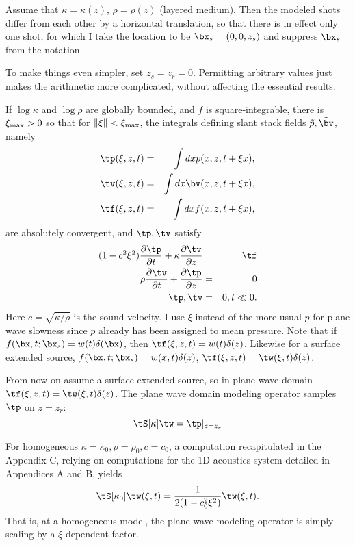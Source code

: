 Assume that $\kappa = \kappa(z)$,
$\rho=\rho(z)$ (layered medium). Then the modeled shots differ from
each other by a horizontal translation, so that there is in effect
only one shot, for which I take the location to be
$\bx_s=(0,0,z_s)$ and suppress $\bx_s$ from the notation.

To make things even simpler, set $z_s=z_r=0$. Permitting arbitrary
values just makes the arithmetic more complicated, without affecting
the essential results.

 If $\log \kappa$ and $\log \rho$ are globally
bounded, and $f$ is square-integrable, there is $\xi_{\rm max} > 0$ so that for $\|\xi\|<\xi_{\rm
  max}$, the integrals defining slant stack fields
$\tilde{p},\tilde{\bv}$, namely
\begin{eqnarray}
\label{eqn:slant}
\tp(\xi,z,t)& = &\int dx p(x,z,t+\xi x),\nonumber\\
\tv(\xi,z,t)&=&\int dx \bv(x,z,t+\xi x),\nonumber\\
\tf(\xi,z,t)&=&\int dx f(x,z,t+\xi x),
\end{eqnarray}
are absolutely convergent, and $\tp, \tv$ satisfy 
\begin{eqnarray}
\label{eqn:awepw}
(1-c^2\xi^2)\frac{\partial \tp}{\partial t} + \kappa\frac{\partial
  \tv}{\partial z} &=& \tf \nonumber\\
\rho \frac{\partial \tv}{\partial t} + \frac{\partial \tp}{\partial
  z}&=&0\nonumber\\
\tp,\tv&=&0, t \ll 0.
\end{eqnarray}
Here $c=\sqrt{\kappa/\rho}$ is the sound velocity. I use $\xi$ instead
of the more usual $p$ for plane wave slowness since $p$ already has
been assigned to mean pressure. Note that if
$f(\bx,t;\bx_s)=w(t)\delta(\bx)$, then
$\tf(\xi,z,t)=w(t)\delta(z)$. Likewise for a surface extended source,
$f(\bx,t;\bx_s) = w(x,t)\delta(z)$, $\tf(\xi,z,t) = \tw(\xi,t)\delta(z)$.

From now on assume a surface extended source, so in plane wave domain
$\tf(\xi,z,t) = \tw(\xi,t)\delta(z)$. The plane wave domain modeling
operator samples $\tp$ on $z=z_r$:
\begin{equation}
\label{eqn:modpw}
\tS[\kappa]\tw = \tp|_{z=z_r}
\end{equation}

For homogeneous $\kappa=\kappa_0, \rho=\rho_0, c=c_0$, a computation
recapitulated in the Appendix C, relying on computations for the 1D
acoustics system detailed in Appendices A and B, yields
\begin{equation}
\label{eqn:modhom}
\tS[\kappa_0]\tw(\xi,t) = \frac{1}{2(1-c_0^2\xi^2)}\tw(\xi,t).
\end{equation}
That is, at a homogeneous model, the plane wave modeling operator is
simply scaling by a $\xi$-dependent factor.

